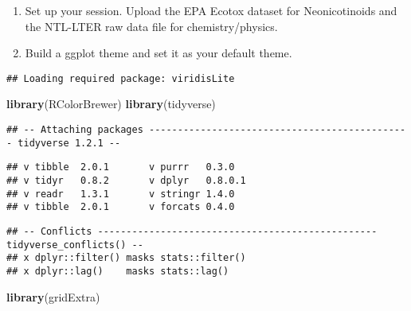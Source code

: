 \documentclass[]{article}
\newenvironment{Shaded}{\begin{snugshade}}{\end{snugshade}}
\newcommand{\KeywordTok}[1]{\textcolor[rgb]{0.13,0.29,0.53}{\textbf{#1}}}
\newcommand{\CommentTok}[1]{\textcolor[rgb]{0.56,0.35,0.01}{\textit{#1}}}
\newcommand{\NormalTok}[1]{#1}
\begin{document}
\begin{enumerate}
\def\labelenumi{\arabic{enumi}.}
\item
  Set up your session. Upload the EPA Ecotox dataset for Neonicotinoids
  and the NTL-LTER raw data file for chemistry/physics.
\item
  Build a ggplot theme and set it as your default theme.
\end{enumerate}

\begin{Shaded}
\end{Shaded}

\begin{verbatim}
## Loading required package: viridisLite
\end{verbatim}

\begin{Shaded}
\begin{Highlighting}[]
\KeywordTok{library}\NormalTok{(RColorBrewer)}
\KeywordTok{library}\NormalTok{(tidyverse)}
\end{Highlighting}
\end{Shaded}

\begin{verbatim}
## -- Attaching packages ---------------------------------------------- tidyverse 1.2.1 --
\end{verbatim}

\begin{verbatim}
## v tibble  2.0.1       v purrr   0.3.0  
## v tidyr   0.8.2       v dplyr   0.8.0.1
## v readr   1.3.1       v stringr 1.4.0  
## v tibble  2.0.1       v forcats 0.4.0
\end{verbatim}

\begin{verbatim}
## -- Conflicts ------------------------------------------------- tidyverse_conflicts() --
## x dplyr::filter() masks stats::filter()
## x dplyr::lag()    masks stats::lag()
\end{verbatim}

\begin{Shaded}
\begin{Highlighting}[]
\KeywordTok{library}\NormalTok{(gridExtra)}
\end{Highlighting}
\end{Shaded}
\end{document}

